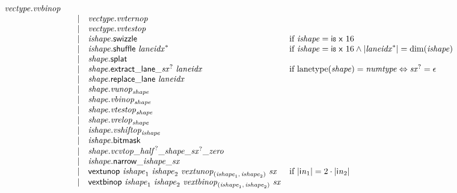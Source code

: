 $$\begin{array}{@{}lrrl@{}l@{}}
{\mathit{vectype}} . {\mathit{vvbinop}} \\ &&|&
{\mathit{vectype}} . {\mathit{vvternop}} \\ &&|&
{\mathit{vectype}} . {\mathit{vvtestop}} \\ &&|&
{\mathit{ishape}}.\mathsf{swizzle} &\quad
  \mbox{if}~{\mathit{ishape}} = \mathsf{i{\scriptstyle8}}~\mathsf{x}~16 \\ &&|&
{\mathit{ishape}}.\mathsf{shuffle}~{{\mathit{laneidx}}^\ast} &\quad
  \mbox{if}~{\mathit{ishape}} = \mathsf{i{\scriptstyle8}}~\mathsf{x}~16 \land {|{{\mathit{laneidx}}^\ast}|} = {\mathrm{dim}}({\mathit{ishape}}) \\ &&|&
{\mathit{shape}}.\mathsf{splat} \\ &&|&
{{\mathit{shape}}.\mathsf{extract\_lane\_}}{{{\mathit{sx}}^?}}~{\mathit{laneidx}} &\quad
  \mbox{if}~{\mathrm{lanetype}}({\mathit{shape}}) = {\mathit{numtype}} \Leftrightarrow {{\mathit{sx}}^?} = \epsilon \\ &&|&
{\mathit{shape}}.\mathsf{replace\_lane}~{\mathit{laneidx}} \\ &&|&
{\mathit{shape}} . {{\mathit{vunop}}}_{{\mathit{shape}}} \\ &&|&
{\mathit{shape}} . {{\mathit{vbinop}}}_{{\mathit{shape}}} \\ &&|&
{\mathit{shape}} . {{\mathit{vtestop}}}_{{\mathit{shape}}} \\ &&|&
{\mathit{shape}} . {{\mathit{vrelop}}}_{{\mathit{shape}}} \\ &&|&
{\mathit{ishape}} . {{\mathit{vshiftop}}}_{{\mathit{ishape}}} \\ &&|&
{\mathit{ishape}}.\mathsf{bitmask} \\ &&|&
{\mathit{shape}} . {{{{{{{{{\mathit{vcvtop}}}{\mathsf{\_}}}{{{\mathit{half}}^?}}}{\mathsf{\_}}}{{\mathit{shape}}}}{\mathsf{\_}}}{{{\mathit{sx}}^?}}}{\mathsf{\_}}}{{\mathit{zero}}} \\ &&|&
{{{{{\mathit{ishape}}.\mathsf{narrow}}{\mathsf{\_}}}{{\mathit{ishape}}}}{\mathsf{\_}}}{{\mathit{sx}}} \\ &&|&
\mathsf{vextunop}~{\mathit{ishape}}_{{1}}~{\mathit{ishape}}_{{2}}~{{\mathit{vextunop}}}_{({\mathit{ishape}}_{{1}},\, {\mathit{ishape}}_{{2}})}~{\mathit{sx}} &\quad
  \mbox{if}~{|{{\mathsf{i}}{{\mathit{n}}}}_{{1}}|} = 2 \cdot {|{{\mathsf{i}}{{\mathit{n}}}}_{{2}}|} \\ &&|&
\mathsf{vextbinop}~{\mathit{ishape}}_{{1}}~{\mathit{ishape}}_{{2}}~{{\mathit{vextbinop}}}_{({\mathit{ishape}}_{{1}},\, {\mathit{ishape}}_{{2}})}~{\mathit{sx}} &\quad

\end{array}$$
